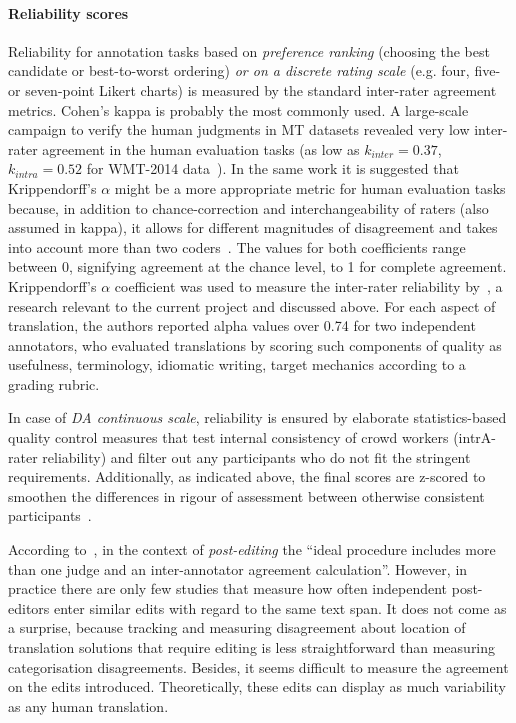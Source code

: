 \paragraph{Reliability scores} 
Reliability for annotation tasks based on \textit{preference ranking} (choosing the best candidate or best-to-worst ordering) \textit{or on a discrete rating scale} (e.g. four, five- or seven-point Likert charts) is measured by the standard inter-rater agreement metrics. Cohen's kappa is probably the most commonly used. A large-scale campaign to verify the human judgments in MT datasets revealed very low inter-rater agreement in the human evaluation tasks (as low as $k_{inter} =0.37$, $k_{intra} =0.52$ for WMT-2014 data~\cite{Graham2015}). 
In the same work it is suggested that Krippendorff's $\alpha$ might be a more appropriate metric for human evaluation tasks because, in addition to chance-correction and interchangeability of raters (also assumed in kappa), it allows for different magnitudes of disagreement
and takes into account more than two coders~\cite{Artstein2008}. 
The values for both coefficients range between 0, signifying agreement at the chance level, to 1 for complete agreement. Krippendorff's $\alpha$ coefficient was used to measure the inter-rater reliability by~\citet{Yuan2020}, a research relevant to the current project and discussed above. For each aspect of translation, the authors reported alpha values over 0.74 for two independent annotators, who evaluated translations by scoring such components of quality as usefulness, terminology, idiomatic writing, target mechanics according to a grading rubric.

In case of \textit{DA continuous scale}, reliability is ensured by elaborate statistics-based quality control measures that test internal consistency of crowd workers (intrA-rater reliability) and filter out any participants who do not fit the stringent requirements. Additionally, as indicated above, the final scores are z-scored to smoothen the differences in rigour of assessment between otherwise consistent participants~\cite{Graham2013}. 

According to~\citet{Chatzikoumi2020}, in the context of \textit{post-editing} the ``ideal procedure includes more than one judge and an inter-annotator agreement calculation''. However, in practice there are only few studies that measure how often independent post-editors enter similar edits with regard to the same text span. 
It does not come as a surprise, because tracking and measuring disagreement about location of translation solutions that require editing is less straightforward than measuring categorisation disagreements. Besides, it seems difficult to measure the agreement on the edits introduced. Theoretically, these edits can display as much variability as any human translation. 

